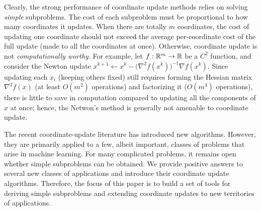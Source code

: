 
Clearly, the strong performance of coordinate
update methods relies on solving \emph{simple} subproblems. The cost of each subproblem must be proportional to how many coordinates it updates. %
When there are totally $m$ coordinates, the cost of updating one coordinate should not exceed the average per-coordinate cost of the full update (made to all the coordinates at once). Otherwise, coordinate update is not \emph{computationally worthy}. For example, let  $f:\mathbb{R}^m\to \mathbb{R}$ be  a $C^2$ function, and consider the Newton update  $x^{k+1} \gets x^k - \big(\nabla^2 f(x^k)\big)^{-1}\nabla f(x^k)$. Since updating each $x_i$ (keeping others  fixed) still requires forming the Hessian matrix $\nabla^2 f(x)$ (at least $O(m^2)$ operations) and factorizing it ($O(m^3)$ operations), there is little to save in computation compared to updating all the components of $x$ at once; hence, the Netwon's method is generally not amenable to coordinate update.

The recent coordinate-update literature has introduced new algorithms. However, they are primarily applied to a few, albeit important, classes of problems  that arise in machine learning. For many complicated problems,  it remains open whether simple subproblems can be obtained. We provide positive answers to several new classes of applications and introduce their coordinate update algorithms. %
Therefore, the focus of this paper is to build a set of tools for deriving simple subproblems and extending  coordinate updates to new territories of applications.

